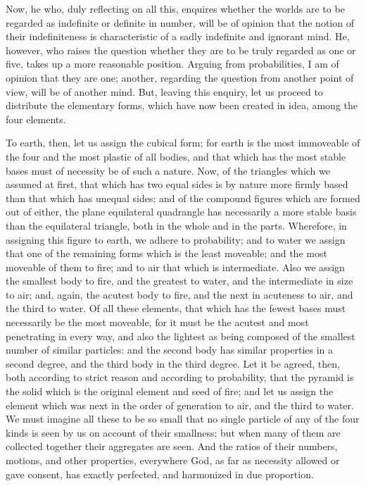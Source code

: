 \documentclass[11pt,letter]{article}
\begin{document}
\par  Now, he who, duly reflecting on all this, enquires whether the worlds are to be regarded as indefinite or definite in number, will be of opinion that the notion of their indefiniteness is characteristic of a sadly indefinite and ignorant mind. He, however, who raises the question whether they are to be truly regarded as one or five, takes up a more reasonable position. Arguing from probabilities, I am of opinion that they are one; another, regarding the question from another point of view, will be of another mind. But, leaving this enquiry, let us proceed to distribute the elementary forms, which have now been created in idea, among the four elements.

\par  To earth, then, let us assign the cubical form; for earth is the most immoveable of the four and the most plastic of all bodies, and that which has the most stable bases must of necessity be of such a nature. Now, of the triangles which we assumed at first, that which has two equal sides is by nature more firmly based than that which has unequal sides; and of the compound figures which are formed out of either, the plane equilateral quadrangle has necessarily a more stable basis than the equilateral triangle, both in the whole and in the parts. Wherefore, in assigning this figure to earth, we adhere to probability; and to water we assign that one of the remaining forms which is the least moveable; and the most moveable of them to fire; and to air that which is intermediate. Also we assign the smallest body to fire, and the greatest to water, and the intermediate in size to air; and, again, the acutest body to fire, and the next in acuteness to air, and the third to water. Of all these elements, that which has the fewest bases must necessarily be the most moveable, for it must be the acutest and most penetrating in every way, and also the lightest as being composed of the smallest number of similar particles: and the second body has similar properties in a second degree, and the third body in the third degree. Let it be agreed, then, both according to strict reason and according to probability, that the pyramid is the solid which is the original element and seed of fire; and let us assign the element which was next in the order of generation to air, and the third to water. We must imagine all these to be so small that no single particle of any of the four kinds is seen by us on account of their smallness: but when many of them are collected together their aggregates are seen. And the ratios of their numbers, motions, and other properties, everywhere God, as far as necessity allowed or gave consent, has exactly perfected, and harmonized in due proportion.
\end{document}
